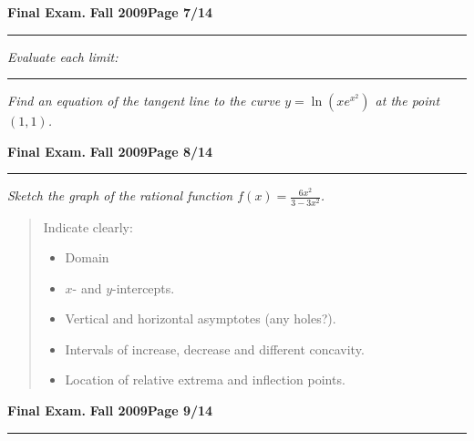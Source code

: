 \documentclass[12pt]{article}
\begin{document}
\newpage
\hfill{\large\bf Final Exam.}\hfill{\large\bf
  Fall 2009}\hfill{\large\bf Page 7/14}\hrule

\bigskip
{\problem[10 pts] \em  Evaluate each limit:} 

\bigskip
{}

\vspace{4cm}
\vspace{5cm}

\hrule
{\problem[10 pts] \em Find an equation of the tangent line to the
  curve $y=\ln(x e^{x^2})$ at the point $(1,1)$.} 
\newpage

\hfill{\large\bf Final Exam.}\hfill{\large\bf
  Fall 2009}\hfill{\large\bf Page 8/14}\hrule

\bigskip
{\problem[30 pts] \em Sketch the graph of the rational function $f(x)
  = \displaystyle{\frac{6x^2}{3-3x^2}}$.}
\begin{quotation}
Indicate clearly:
\begin{itemize}
\item Domain
\item $x$- and $y$-intercepts.
\item Vertical and horizontal asymptotes (any holes?).
\item Intervals of increase, decrease and different concavity.
\item Location of relative extrema and inflection points. 
\end{itemize}
\end{quotation}
\newpage

\hfill{\large\bf Final Exam.}\hfill{\large\bf
  Fall 2009}\hfill{\large\bf Page 9/14}\hrule
\end{document}
